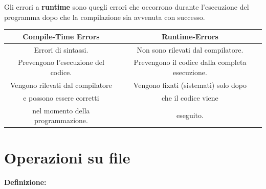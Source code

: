 \textsf{\small Gli errori a \textbf{runtime} sono quegli errori che occorrono durante l'esecuzione del programma dopo che la compilazione sia avvenuta con successo.} \break

\begin{tabular}{|c|c|}
	\hline
	\textbf{Compile-Time Errors} & \textbf{Runtime-Errors} \\
	\hline
	\textsf{\small Errori di sintassi.} & \textsf{\small Non sono rilevati dal compilatore.} \\
	\textsf{\small Prevengono l'esecuzione del codice.} & \textsf{\small Prevengono il codice dalla completa esecuzione.} \\
	\textsf{\small Vengono rilevati dal compilatore } & \textsf{\small Vengono fixati (sistemati) solo dopo} \\
	\textsf{\small e possono essere corretti} & \textsf{\small che il codice viene} \\
	\textsf{\small nel momento della programmazione.} & \textsf{\small eseguito.} \\
	\hline
\end{tabular}




\newpage

\section{Operazioni su file}

\textsf{\small \textbf{Definizione: } } \\


